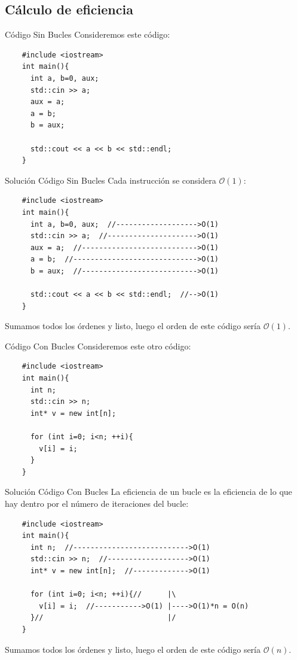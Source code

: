 \documentclass[compress]{beamer}
\begin{document}
\subsection{Cálculo de eficiencia}

\begin{frame}[fragile]{Código Sin Bucles}
Consideremos este código:\\
\vspace{0.20in}
	\begin{lstlisting}
	#include <iostream>
	int main(){
	  int a, b=0, aux;
	  std::cin >> a;
	  aux = a;
	  a = b;
	  b = aux;

	  std::cout << a << b << std::endl;
	}
	\end{lstlisting}
\end{frame}

\begin{frame}[fragile]{Solución Código Sin Bucles}
Cada instrucción se considera $\mathcal{O}(1)$:
	\begin{lstlisting}
	#include <iostream>
	int main(){
	  int a, b=0, aux;  //------------------->O(1)
	  std::cin >> a;  //--------------------->O(1)
	  aux = a;  //--------------------------->O(1)
	  a = b;  //----------------------------->O(1)
	  b = aux;  //--------------------------->O(1)

	  std::cout << a << b << std::endl;  //-->O(1)
	}
	\end{lstlisting}
Sumamos todos los órdenes y listo, luego el orden de este código sería $\mathcal{O}(1)$.
\end{frame}

\begin{frame}[fragile]{Código Con Bucles}
Consideremos este otro código:\\
\vspace{0.20in}
	\begin{lstlisting}
	#include <iostream>
	int main(){
	  int n;
	  std::cin >> n;
	  int* v = new int[n];

	  for (int i=0; i<n; ++i){
	    v[i] = i;
	  }
	}
	\end{lstlisting}
\end{frame}

\begin{frame}[fragile]{Solución Código Con Bucles}
La eficiencia de un bucle es la eficiencia de lo que hay dentro por el número de iteraciones del bucle:\\
\vspace{0.20in}
	\begin{lstlisting}
	#include <iostream>
	int main(){
	  int n;  //--------------------------->O(1)
	  std::cin >> n;  //------------------->O(1)
	  int* v = new int[n];  //------------->O(1)

	  for (int i=0; i<n; ++i){//      |\
	    v[i] = i;  //----------->O(1) |---->O(1)*n = O(n)
	  }//                             |/
	}
	\end{lstlisting}
Sumamos todos los órdenes y listo, luego el orden de este código sería $\mathcal{O}(n)$.
\end{frame}
\end{document}
